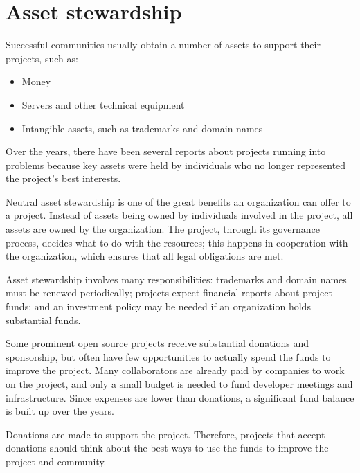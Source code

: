 


\chapter{Asset stewardship}

Successful communities usually obtain a number of assets to support their projects, such as:

\begin{itemize}

\item Money

\item Servers and other technical equipment

\item Intangible assets, such as trademarks and domain names

\end{itemize}

Over the years, there have been several reports about projects running into problems because key assets were held by individuals who no longer represented the project's best interests.

Neutral asset stewardship is one of the great benefits an organization can offer to a project.  Instead of assets being owned by individuals involved in the project, all assets are owned by the organization.  The project, through its governance process, decides what to do with the resources; this happens in cooperation with the organization, which ensures that all legal obligations are met.

Asset stewardship involves many responsibilities: trademarks and domain names must be renewed periodically; projects expect financial reports about project funds; and an investment policy may be needed if an organization holds substantial funds.

\begin{kaobox}[frametitle=Projects with big balances]

Some prominent open source projects receive substantial donations and sponsorship, but often have few opportunities to actually spend the funds to improve the project.  Many collaborators are already paid by companies to work on the project, and only a small budget is needed to fund developer meetings and infrastructure.  Since expenses are lower than donations, a significant fund balance is built up over the years.

Donations are made to support the project.  Therefore, projects that accept donations should think about the best ways to use the funds to improve the project and community.

\end{kaobox}

